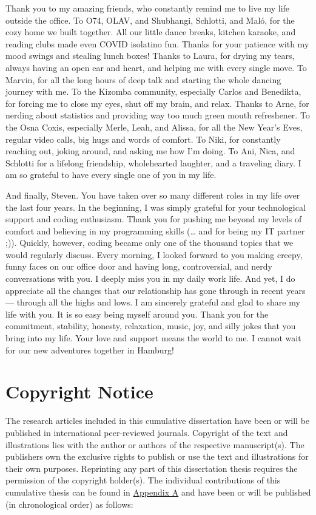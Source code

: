 \documentclass[
]{scrbook}
\begin{document}
Thank you to my amazing friends, who constantly remind me to live my life outside the office. To O74, OLAV, and Shubhangi, Schlotti, and Maló, for the cozy home we built together. All our little dance breaks, kitchen karaoke, and reading clubs made even COVID isolatino fun. Thanks for your patience with my mood swings and stealing lunch boxes! Thanks to Laura, for drying my tears, always having an open ear and heart, and helping me with every single move. To Marvin, for all the long hours of deep talk and starting the whole dancing journey with me. To the Kizomba community, especially Carlos and Benedikta, for forcing me to close my eyes, shut off my brain, and relax. Thanks to Arne, for nerding about statistics and providing way too much green mouth refreshener. To the Osna Coxis, especially Merle, Leah, and Alissa, for all the New Year's Eves, regular video calls, big hugs and words of comfort. To Niki, for constantly reaching out, joking around, and asking me how I'm doing. To Ani, Nica, and Schlotti for a lifelong friendship, wholehearted laughter, and a traveling diary. I am so grateful to have every single one of you in my life.

And finally, Steven. You have taken over so many different roles in my life over the last four years. In the beginning, I was simply grateful for your technological support and coding enthusiasm. Thank you for pushing me beyond my levels of comfort and believing in my programming skills (\ldots{} and for being my IT partner ;)). Quickly, however, coding became only one of the thousand topics that we would regularly discuss. Every morning, I looked forward to you making creepy, funny faces on our office door and having long, controversial, and nerdy conversations with you. I deeply miss you in my daily work life. And yet, I do appreciate all the changes that our relationship has gone through in recent years --- through all the highs and lows. I am sincerely grateful and glad to share my life with you. It is so easy being myself around you. Thank you for the commitment, stability, honesty, relaxation, music, joy, and silly jokes that you bring into my life. Your love and support means the world to me. I cannot wait for our new adventures together in Hamburg!

\chapter{Copyright Notice}\label{copyright}

The research articles included in this cumulative dissertation have been or will be published in international peer-reviewed journals. Copyright of the text and illustrations lies with the author or authors of the respective manuscript(s). The publishers own the exclusive rights to publish or use the text and illustrations for their own purposes. Reprinting any part of this dissertation thesis requires the permission of the copyright holder(s).
The individual contributions of this cumulative thesis can be found in \hyperref[appendixA]{Appendix A} and have been or will be published (in chronological order) as follows:
\end{document}
